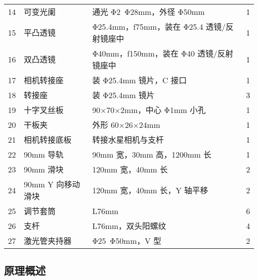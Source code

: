 \documentclass[dvipsnames, svgnames,a4paper,11pt]{article}
\begin{document}
\begin{longtable}{p{}|p{}|p{}|p{}}
	14 & 可变光阑 & 通光 Φ2~Φ28mm，外径 Φ50mm  & 1	\\

	15 & 平凸透镜 & Φ25.4mm，f75mm，装在 Φ25.4 透镜/反射镜座中  & 1	\\

	16 & 双凸透镜 & Φ40mm，f150mm，装在 Φ40 透镜/反射镜座中  & 1	\\

	17 & 相机转接座 & 装 Φ25.4mm 镜片，C 接口  & 1	\\

	18 & 转接座 & 装 Φ25.4mm 镜片  & 3	\\

	19 & 十字叉丝板 & 90×70×2mm，中心 Φ1mm 小孔  & 1	\\

	20 & 干板夹 & 外形 60×26×24mm  & 1	\\

	21 & 相机转接底板 & 转接水星相机与支杆  & 1	\\

	22 & 90mm 导轨 & 90mm 宽，30mm 高，1200mm 长  & 1	\\

	23 & 90mm 滑块 & 120mm 宽，40mm 长  & 2	\\

	24 & 90mm Y 向移动滑块 & 120mm 宽，40mm 长，Y 轴平移  & 2	\\

	25 & 调节套筒 & L76mm  & 6	\\
	
	26 & 支杆 & L76mm，双头阳螺纹  & 4	\\

	27 & 激光管夹持器 & Φ25~Φ50mm，V 型  & 2	\\
\end{longtable}





\subsection{原理概述}
\end{document}
